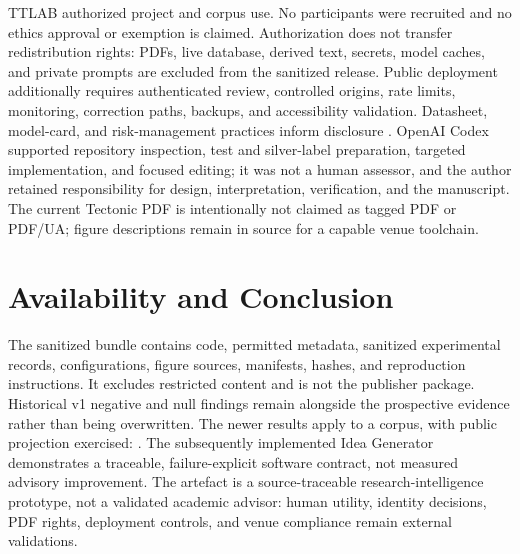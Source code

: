 \documentclass[conference,letterpaper]{IEEEtran}
\begin{document}
TTLAB authorized project and corpus use. No participants were recruited and no ethics approval or exemption is claimed. Authorization does not transfer redistribution rights: PDFs, live database, derived text, secrets, model caches, and private prompts are excluded from the sanitized release. Public deployment additionally requires authenticated review, controlled origins, rate limits, monitoring, correction paths, backups, and accessibility validation. Datasheet, model-card, and risk-management practices inform disclosure \cite{gebru2021datasheets,mitchell2019modelcards,tabassi2023airmf}. OpenAI Codex supported repository inspection, test and silver-label preparation, targeted implementation, and focused editing; it was not a human assessor, and the author retained responsibility for design, interpretation, verification, and the manuscript. The current Tectonic PDF is intentionally not claimed as tagged PDF or PDF/UA; figure descriptions remain in source for a capable venue toolchain.

\section{Availability and Conclusion}
The sanitized bundle contains code, permitted metadata, sanitized experimental records, configurations, figure sources, manifests, hashes, and reproduction instructions. It excludes restricted content and is not the publisher package. Historical v1 negative and null findings remain alongside the \VTwoPackageStatus{} prospective evidence rather than being overwritten. The newer results apply to a \VTwoEvaluationScope{} corpus, with public projection exercised: \VTwoPublicProjectionExercised{}. The subsequently implemented Idea Generator demonstrates a traceable, failure-explicit software contract, not measured advisory improvement. The artefact is a source-traceable research-intelligence prototype, not a validated academic advisor: human utility, identity decisions, PDF rights, deployment controls, and venue compliance remain external validations.



\end{document}
